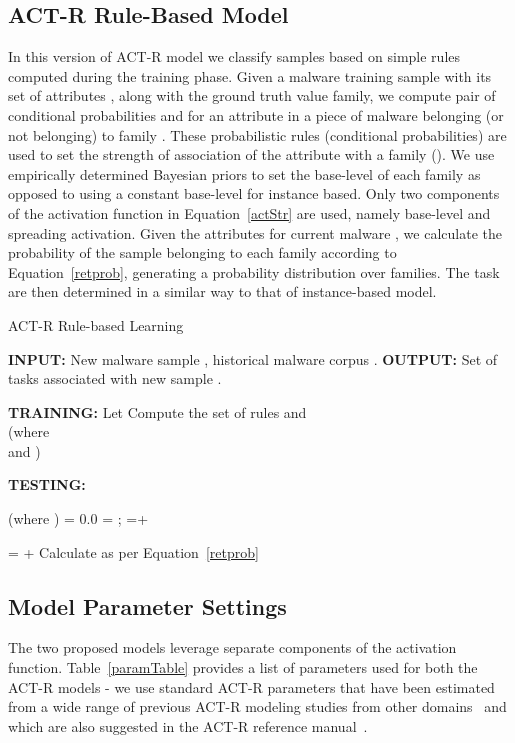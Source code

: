 \documentclass[conference]{IEEEtran}
\begin{document}
\subsection{ACT-R Rule-Based Model}
In this version of ACT-R model we classify samples based on simple rules computed during the training phase. Given a malware training sample with its set of attributes , along with the ground truth value family, we compute pair of conditional probabilities  and  for an attribute in a piece of malware belonging (or not belonging) to family . These probabilistic rules (conditional probabilities) are used to set the strength of association of the attribute with a family (). We use empirically determined Bayesian priors  to set the base-level of each family as opposed to using a constant base-level for instance based. Only two components of the activation function in Equation~\ref{actStr} are used, namely base-level and spreading activation. Given the attributes for current malware , we calculate the probability of the sample belonging to each family according to Equation~\ref{retprob}, generating a probability distribution over families. The task are then determined in a similar way to that of instance-based model. \smallskip

\begin{algorithm}[]
	\caption{ACT-R Rule-based Learning}
	\begin{algorithmic}
		
		\STATE \textbf {INPUT:} New malware sample , historical malware corpus .
		\STATE \textbf {OUTPUT:} Set of tasks associated with new sample .
		
		
		\STATE \textbf{TRAINING:}
		\STATE Let 
		\STATE Compute the set of rules  and \\ (where \\ and )
		\ENDFOR
		
		\STATE \textbf{TESTING:}
		
		\FORALL {}
		\STATE  (where )
		\STATE  = 0.0
		\FORALL {}
		\STATE  = ;  =+ 
		
		\ENDFOR
		
		\STATE  =  + 
		\ENDFOR
		\STATE Calculate  as per Equation~\ref{retprob}
		
		\STATE 
		
	
		
	\end{algorithmic}
\end{algorithm}

\subsection{Model Parameter Settings}
The two proposed models leverage separate components of the activation function.  Table~\ref{paramTable} provides a list of parameters used for both the ACT-R models - we use standard ACT-R parameters that have been estimated from a wide range of previous ACT-R modeling studies from other domains~\cite{parameters} and which are also suggested in the ACT-R reference manual~\cite{actr}. 
\end{document}
